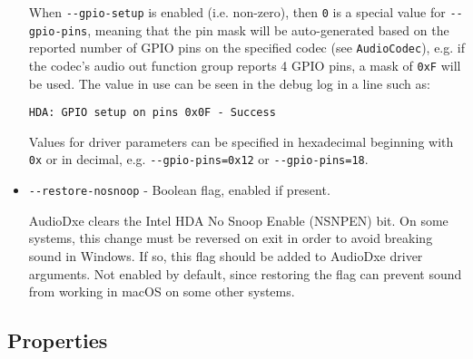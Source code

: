 \documentclass[]{article}
\begin{document}
\begin{itemize}
  When \texttt{-{}-gpio-setup} is enabled (i.e. non-zero), then \texttt{0} is a special
  value for \texttt{-{}-gpio-pins}, meaning that the pin mask will be auto-generated based on the
  reported number of GPIO pins on the specified codec (see \texttt{AudioCodec}), e.g. if the
  codec's audio out function group reports 4 GPIO pins, a mask of \texttt{0xF} will be used.
  The value in use can be seen in the debug log in a line such as: \medskip

  \texttt{HDA: GPIO setup on pins 0x0F - Success} \medskip

  Values for driver parameters can be specified in hexadecimal beginning with \texttt{0x} or
  in decimal, e.g. \texttt{-{}-gpio-pins=0x12} or \texttt{-{}-gpio-pins=18}.

	\item \texttt{-{}-restore-nosnoop} - Boolean flag, enabled if present. \medskip

  AudioDxe clears the Intel HDA No Snoop Enable (NSNPEN) bit. On some systems, this change must
  be reversed on exit in order to avoid breaking sound in Windows. If so, this flag should
  be added to AudioDxe driver arguments.
  Not enabled by default, since restoring the flag can prevent sound from working in macOS on
  some other systems. \medskip
\end{itemize}

\subsection{Properties}\label{uefiprops}
\end{document}
